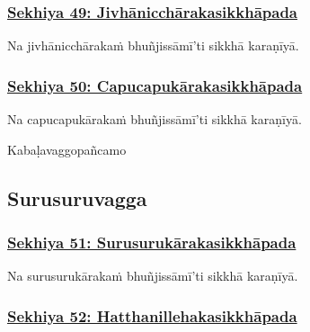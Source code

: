 \subsubsection*{\hyperref[training49]{Sekhiya 49: Jivhānicchārakasikkhāpada}}
\label{sekh49}

Na jivhānicchārakaṁ bhuñjissāmī'ti sikkhā karaṇīyā.



\subsubsection*{\hyperref[training50]{Sekhiya 50: Capucapukārakasikkhāpada}}
\label{sekh50}

Na capucapukārakaṁ bhuñjissāmī'ti sikkhā karaṇīyā.

\begin{center}
	Kabaḷavaggo\makeatletter\hyperlink{endnote501-appendix}\makeatother \thinspace pañcamo\makeatletter\hyperlink{endnote502-appendix}\makeatother \thinspace
\end{center}



\subsection{Surusuruvagga}

\subsubsection*{\hyperref[training51]{Sekhiya 51: Surusurukārakasikkhāpada}}
\label{sekh51}

Na surusurukārakaṁ bhuñjissāmī'ti sikkhā karaṇīyā.



\subsubsection*{\hyperref[training52]{Sekhiya 52: Hatthanillehakasikkhāpada}}
\label{sekh52}


